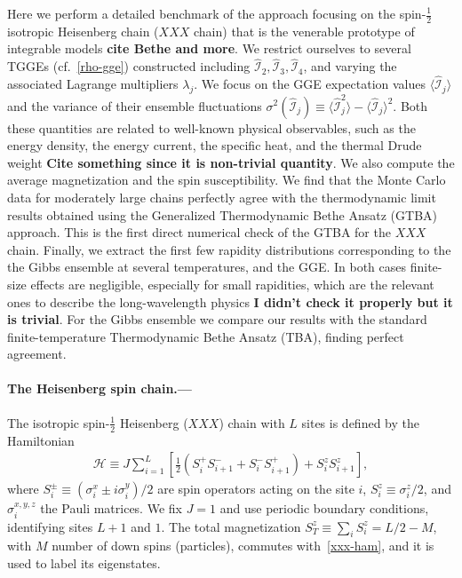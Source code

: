 \documentclass[twocolumn,superscriptaddress,prb,10pt]{revtex4-1}
\begin{document}
Here we perform a detailed benchmark of the approach focusing on the 
spin-$\frac{1}{2}$ isotropic Heisenberg chain ($XXX$ chain) that is the venerable 
prototype of integrable models {\bf cite Bethe and more}. We restrict ourselves to  
several TGGEs (cf.~\eqref{rho-gge}) constructed including $\hat{\mathcal I}_2,
\hat{\mathcal I}_3,\hat{\mathcal I}_4$, and varying the associated Lagrange multipliers 
$\lambda_j$. We focus on the GGE expectation values $\langle\hat{\mathcal I}_j\rangle$ 
and the variance of their ensemble fluctuations $\sigma^2(\hat{\mathcal I}_j)\equiv
\langle\hat{\mathcal I}_j^2\rangle-\langle\hat{\mathcal I}_j\rangle^2$. Both these 
quantities are related to well-known physical observables, such as the energy density, 
the energy current, the specific heat, and the thermal Drude weight {\bf Cite something 
since it is non-trivial quantity}. We also compute the average magnetization and the spin 
susceptibility. We find that the Monte Carlo data for moderately large chains perfectly 
agree with the thermodynamic limit results obtained using the Generalized Thermodynamic 
Bethe Ansatz (GTBA) approach. This is the first direct numerical check of the GTBA for 
the $XXX$ chain. Finally, we extract the first few rapidity distributions corresponding 
to the the Gibbs ensemble at several temperatures, and the GGE. In both cases finite-size 
effects are negligible, especially for small rapidities, which are the relevant ones to 
describe the long-wavelength physics {\bf I didn't check it properly but it is trivial}. 
For the Gibbs ensemble we compare our results with 
the standard finite-temperature Thermodynamic Bethe Ansatz (TBA), finding perfect agreement. 


\paragraph*{The Heisenberg spin chain.---}

The isotropic spin-$\frac{1}{2}$ Heisenberg ($XXX$) chain with $L$ sites is defined by 
the Hamiltonian 
%
\begin{align}
\label{xxx-ham}
{\mathcal H}\equiv J\sum\limits_{i=1}^L\left[\frac{1}{2}(S_i^+S^-_{i+1} 
+S_i^{-}S_{i+1}^+)+S_i^zS_{i+1}^z\right],  
\end{align}
%
where $S^{\pm}_i\equiv (\sigma_i^x\pm i\sigma_i^y)/2$ are spin operators acting on the 
site $i$, $S_i^z\equiv\sigma_i^z/2$, and $\sigma^{x,y,z}_i$ the Pauli matrices. We fix 
$J=1$ and use periodic boundary conditions, identifying sites $L+1$ and $1$. The total 
magnetization $S_{T}^z\equiv\sum_iS_i^z=L/2-M$, with $M$ number of down spins (particles), 
commutes with~\eqref{xxx-ham}, and it is used to label its eigenstates. 
\end{document}
